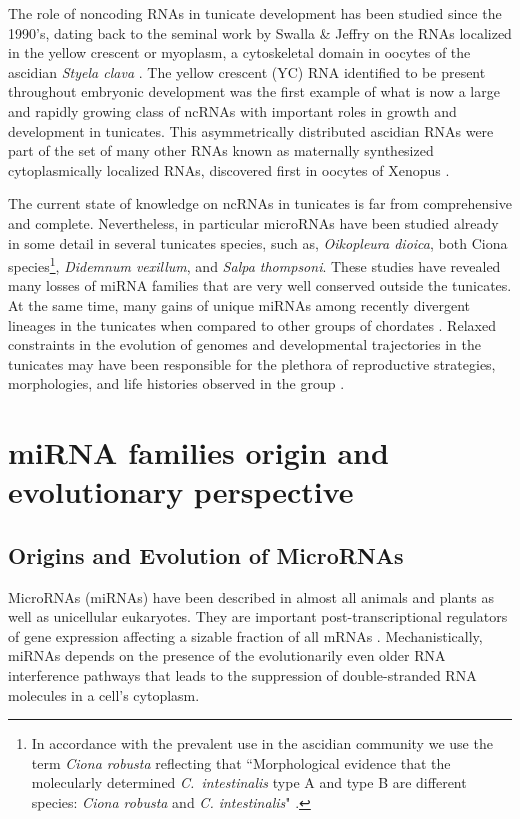 \documentclass[graybox]{svmult}
\begin{document}
The role of noncoding RNAs in tunicate development has been studied since
the 1990's, dating back to the seminal work by Swalla \& Jeffry on the RNAs
localized in the yellow crescent or myoplasm, a cytoskeletal domain in
oocytes of the ascidian \textit{Styela clava} \cite{Swalla1995}. The yellow
crescent (YC) RNA identified to be present throughout embryonic development
was the first example of what is now a large and rapidly growing class of
ncRNAs with important roles in growth and development in tunicates. This
asymmetrically distributed ascidian RNAs were part of the set of many other
RNAs known as maternally synthesized cytoplasmically localized RNAs,
discovered first in oocytes of Xenopus \cite{Bashirullah1998}.

The current state of knowledge on ncRNAs in tunicates is far from
comprehensive and complete. Nevertheless, in particular microRNAs have been
studied already in some detail in several tunicates species, such as,
\textit{Oikopleura dioica}, both Ciona species\footnote{In accordance with
  the prevalent use in the ascidian community we use the term \textit{Ciona
    robusta} reflecting that ``Morphological evidence that the molecularly
  determined \textit{C.\ intestinalis} type A and type B are different
  species: \textit{Ciona robusta} and \textit{C.  intestinalis}"
  \cite{Brunetti:2015}.}, \textit{Didemnum vexillum}, and \textit{Salpa
  thompsoni}. These studies have revealed many losses of miRNA families that
are very well conserved outside the tunicates. At the same time, many gains
of unique miRNAs among recently divergent lineages in the tunicates when
compared to other groups of chordates \cite{Fu:08,
  Velandia-Huerto2016}. Relaxed constraints in the evolution of genomes and
developmental trajectories in the tunicates may have been responsible for
the plethora of reproductive strategies, morphologies, and life histories
observed in the group \cite{Holland2015}.

\section{miRNA families origin and evolutionary perspective}
\label{sec:2}

\subsection{Origins and Evolution of MicroRNAs}

MicroRNAs (miRNAs) have been described in almost all animals and plants as
well as unicellular eukaryotes. They are important post-transcriptional
regulators of gene expression affecting a sizable
fraction of all mRNAs \cite{Ameres:13}. Mechanistically, miRNAs depends on
the presence of the evolutionarily even older RNA interference pathways
\cite{Cerutti:06, Shabalina:08} that leads to the suppression of
double-stranded RNA molecules in a cell's cytoplasm.
\end{document}
